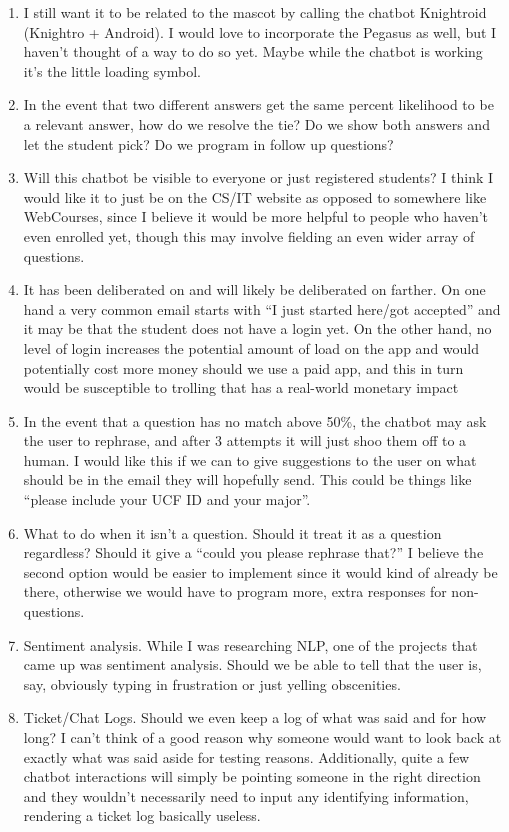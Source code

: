 \documentclass[titlepage, 12pt]{article}
\begin{document}
\begin{enumerate}
    \item I still want it to be related to the mascot by calling the chatbot Knightroid (Knightro + Android). I would love to incorporate the Pegasus as well, but I haven’t thought of a way to do so yet. Maybe while the chatbot is working it’s the little loading symbol.
    \item In the event that two different answers get the same percent likelihood to be a relevant answer, how do we resolve the tie? Do we show both answers and let the student pick? Do we program in follow up questions?
    \item Will this chatbot be visible to everyone or just registered students? I think I would like it to just be on the CS/IT website as opposed to somewhere like WebCourses, since I believe it would be more helpful to people who haven’t even enrolled yet, though this may involve fielding an even wider array of questions.
    \item It has been deliberated on and will likely be deliberated on farther. On one hand a very common email starts with “I just started here/got accepted” and it may be that the student does not have a login yet. On the other hand, no level of login increases the potential amount of load on the app and would potentially cost more money should we use a paid app, and this in turn would be susceptible to trolling that has a real-world monetary impact 
    \item In the event that a question has no match above 50\%, the chatbot may ask the user to rephrase, and after 3 attempts it will just shoo them off to a human. I would like this if we can to give suggestions to the user on what should be in the email they will hopefully send. This could be things like “please include your UCF ID and your major”.
    \item What to do when it isn’t a question. Should it treat it as a question regardless? Should it give a “could you please rephrase that?” I believe the second option would be easier to implement since it would kind of already be there, otherwise we would have to program more, extra responses for non-questions. 
    \item Sentiment analysis. While I was researching NLP, one of the projects that came up was sentiment analysis. Should we be able to tell that the user is, say, obviously typing in frustration or just yelling obscenities.
    \item Ticket/Chat Logs. Should we even keep a log of what was said and for how long? I can’t think of a good reason why someone would want to look back at exactly what was said aside for testing reasons. Additionally, quite a few chatbot interactions will simply be pointing someone in the right direction and they wouldn’t necessarily need to input any identifying information, rendering a ticket log basically useless. 

\end{enumerate}
\end{document}
